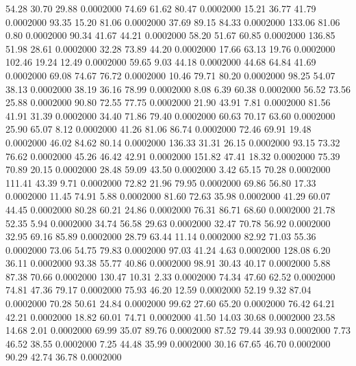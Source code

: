   54.28   30.70   29.88   0.0002000
  74.69   61.62   80.47   0.0002000
  15.21   36.77   41.79   0.0002000
  93.35   15.20   81.06   0.0002000
  37.69   89.15   84.33   0.0002000
 133.06   81.06    0.80   0.0002000
  90.34   41.67   44.21   0.0002000
  58.20   51.67   60.85   0.0002000
 136.85   51.98   28.61   0.0002000
  32.28   73.89   44.20   0.0002000
  17.66   63.13   19.76   0.0002000
 102.46   19.24   12.49   0.0002000
  59.65    9.03   44.18   0.0002000
  44.68   64.84   41.69   0.0002000
  69.08   74.67   76.72   0.0002000
  10.46   79.71   80.20   0.0002000
  98.25   54.07   38.13   0.0002000
  38.19   36.16   78.99   0.0002000
   8.08    6.39   60.38   0.0002000
  56.52   73.56   25.88   0.0002000
  90.80   72.55   77.75   0.0002000
  21.90   43.91    7.81   0.0002000
  81.56   41.91   31.39   0.0002000
  34.40   71.86   79.40   0.0002000
  60.63   70.17   63.60   0.0002000
  25.90   65.07    8.12   0.0002000
  41.26   81.06   86.74   0.0002000
  72.46   69.91   19.48   0.0002000
  46.02   84.62   80.14   0.0002000
 136.33   31.31   26.15   0.0002000
  93.15   73.32   76.62   0.0002000
  45.26   46.42   42.91   0.0002000
 151.82   47.41   18.32   0.0002000
  75.39   70.89   20.15   0.0002000
  28.48   59.09   43.50   0.0002000
   3.42   65.15   70.28   0.0002000
 111.41   43.39    9.71   0.0002000
  72.82   21.96   79.95   0.0002000
  69.86   56.80   17.33   0.0002000
  11.45   74.91    5.88   0.0002000
  81.60   72.63   35.98   0.0002000
  41.29   60.07   44.45   0.0002000
  80.28   60.21   24.86   0.0002000
  76.31   86.71   68.60   0.0002000
  21.78   52.35    5.94   0.0002000
  34.74   56.58   29.63   0.0002000
  32.47   70.78   56.92   0.0002000
  32.95   69.16   85.89   0.0002000
  28.79   63.44   11.14   0.0002000
  82.92   71.03   55.36   0.0002000
  73.06   54.75   79.83   0.0002000
  97.03   41.24    4.63   0.0002000
 128.08    6.20   36.11   0.0002000
  93.38   55.77   40.86   0.0002000
  98.91   30.43   40.17   0.0002000
   5.88   87.38   70.66   0.0002000
 130.47   10.31    2.33   0.0002000
  74.34   47.60   62.52   0.0002000
  74.81   47.36   79.17   0.0002000
  75.93   46.20   12.59   0.0002000
  52.19    9.32   87.04   0.0002000
  70.28   50.61   24.84   0.0002000
  99.62   27.60   65.20   0.0002000
  76.42   64.21   42.21   0.0002000
  18.82   60.01   74.71   0.0002000
  41.50   14.03   30.68   0.0002000
  23.58   14.68    2.01   0.0002000
  69.99   35.07   89.76   0.0002000
  87.52   79.44   39.93   0.0002000
   7.73   46.52   38.55   0.0002000
   7.25   44.48   35.99   0.0002000
  30.16   67.65   46.70   0.0002000
  90.29   42.74   36.78   0.0002000

